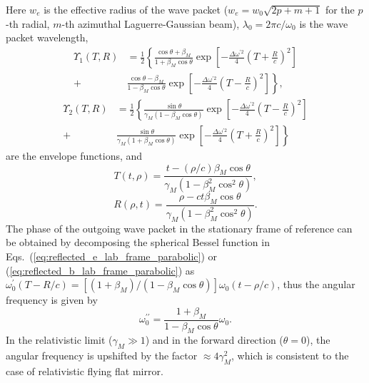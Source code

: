 \documentclass[10pt, a4paper, twoside, openright]{report}
\begin{document}
Here $ w_e $ is the effective radius of the wave packet ($ w_e = w_0 \sqrt{2p + m + 1}$ for the $ p $-th radial, $ m $-th azimuthal Laguerre-Gaussian beam), $ \lambda_0 = 2 \pi c / \omega_0 $ is the wave packet wavelength,
\begin{equation}\label{eq:envelope_function_1}
\begin{aligned}
\Upsilon_1 \left(T, R \right) & = \frac{1}{2} \left\lbrace \frac{\cos \theta + \beta_M}{1 + \beta_M \cos \theta} \exp \left[- \frac{\Delta \omega^{\prime 2}}{4} \left( T + \frac{R}{c} \right)^2 \right] \right. \\
+ & \left. \frac{\cos \theta - \beta_M}{1 - \beta_M \cos \theta} \exp \left[- \frac{\Delta \omega^{\prime 2}}{4} \left( T - \frac{R}{c} \right)^2 \right] \right\rbrace,
\end{aligned}
\end{equation}
\begin{equation}\label{eq:envelope_function_2}
\begin{aligned}
\Upsilon_2 \left(T, R \right) & = \frac{1}{2} \left\lbrace \frac{\sin \theta}{\gamma_M \left( 1 - \beta_M \cos \theta \right) } \exp \left[- \frac{\Delta \omega^{\prime 2}}{4} \left( T - \frac{R}{c} \right)^2 \right] \right. \\
+ & \left. \frac{\sin \theta}{\gamma_M \left( 1 + \beta_M \cos \theta \right) } \exp \left[- \frac{\Delta \omega^{\prime 2}}{4} \left( T + \frac{R}{c} \right)^2 \right] \right\rbrace
\end{aligned}
\end{equation}
are the envelope functions, and
\begin{equation}\label{eq:T}
T \left(t, \rho \right) = \frac{t - \left(\rho / c\right) \beta_M \cos \theta}{\gamma_M \left( 1 - \beta_M^2 \cos^2 \theta \right)},
\end{equation}
\begin{equation}\label{eq:R}
R \left(\rho, t \right) = \frac{\rho - c t \beta_M \cos \theta}{\gamma_M \left( 1 - \beta_M^2 \cos^2 \theta \right)}.
\end{equation}
The phase of the outgoing wave packet in the stationary frame of reference can be obtained by decomposing the spherical Bessel function in Eqs.~(\ref{eq:reflected_e_lab_frame_parabolic}) or (\ref{eq:reflected_b_lab_frame_parabolic}) as $ \omega_0^{\prime} \left( T - R / c \right) = \left[ \left( 1 + \beta_M \right) / \left( 1 - \beta_M \cos \theta \right) \right] \omega_0 \left( t - \rho / c \right) $, thus the angular frequency is given by
\begin{equation}\label{eq:upshift_factor_parabolic}
	\omega_0^{\prime \prime} = \frac{1 + \beta_M}{1 - \beta_M \cos \theta} \omega_0.
\end{equation}
In the relativistic limit ($ \gamma_M \gg 1 $) and in the forward direction ($ \theta = 0 $), the angular frequency is upshifted by the factor $ \approx 4 \gamma_M^2 $, which is consistent to the case of relativistic flying flat mirror.
\end{document}
